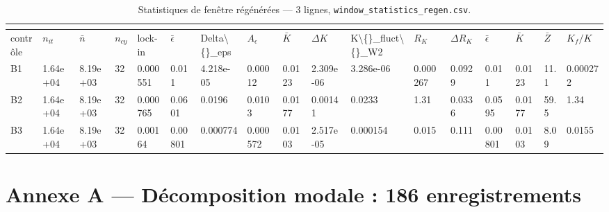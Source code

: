 \documentclass[11pt,a4paper]{article}
\begin{document}
\begin{landscape}
\begingroup\tiny
    \setlength{\tabcolsep}{1.2pt}
    \begin{longtable}{*{17}{l}}
    \caption{Statistiques de fenêtre régénérées --- 3 lignes, \texttt{window\_statistics\_regen.csv}.}\\
    \label{tab:v3r}\\
    \toprule
    contrôle & $n_{it}$ & $\bar{n}$ & $n_{cy}$ & lock-in & $\bar{\epsilon}$ & Delta\textbackslash\{\}\_eps & $A_\epsilon$ & $\bar{K}$ & $\Delta K$ & K\textbackslash\{\}\_fluct\textbackslash\{\}\_W2 & $R_K$ & $\Delta R_K$ & $\bar{\epsilon}$ & $\bar{K}$ & $\bar{Z}$ & $K_f/K$ \\
    \midrule
    \endhead
    \bottomrule
    \endlastfoot
    B1 & 1.64e+04 & 8.19e+03 & 32 & 0.000551 & 0.011 & 4.218e-05 & 0.00012 & 0.0123 & 2.309e-06 & 3.286e-06 & 0.000267 & 0.0929 & 0.011 & 0.0123 & 11.1 & 0.000272 \\
    B2 & 1.64e+04 & 8.19e+03 & 32 & 0.000765 & 0.0601 & 0.0196 & 0.0103 & 0.0177 & 0.00141 & 0.0233 & 1.31 & 0.0336 & 0.0595 & 0.0177 & 59.5 & 1.34 \\
    B3 & 1.64e+04 & 8.19e+03 & 32 & 0.00164 & 0.00801 & 0.000774 & 0.000572 & 0.0103 & 2.517e-05 & 0.000154 & 0.015 & 0.111 & 0.00801 & 0.0103 & 8.09 & 0.0155 \\
    \end{longtable}
\endgroup
\end{landscape}


\appendix

\section{Annexe A --- Décomposition modale : 186 enregistrements}
\end{document}
